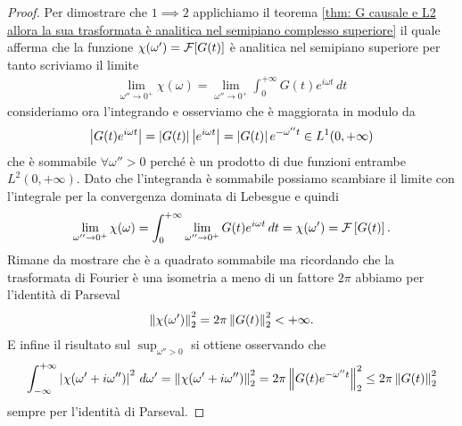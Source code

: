 \begin{proof} %
  Per dimostrare che $ 1 \implies 2 $ applichiamo il teorema 
  \ref{thm: G causale e L2 allora la sua trasformata è analitica nel semipiano complesso superiore} il quale afferma che la funzione 
  $ \chi(\omega') = \operatorname{\mathcal{F}}[G(t)] $ è analitica nel semipiano superiore per tanto scriviamo il limite 
  \begin{align}
    \lim_{\omega''\to 0^+} \chi(\omega) = \lim_{\omega''\to 0^+} \int_{0}^{+\infty} G(t) e^{i\omega t} \, dt
  \end{align}
  consideriamo ora l'integrando e osserviamo che è maggiorata in modulo da 
  \begin{align}
    \left|{G(t) e^{i\omega t}}\right| = \left|{G(t)}\right| \left|{ e^{i\omega t}}\right| = \left|{G(t)}\right| e^{-\omega'' t} \in L^1(0, +\infty)
  \end{align}
  che è sommabile $ \forall \omega'' > 0 $ perché è un prodotto di due funzioni entrambe $ L^2(0, +\infty) $. Dato che l'integranda è sommabile possiamo scambiare il limite con 
  l'integrale per la convergenza dominata di Lebesgue e quindi
  \begin{align}
    \lim_{\omega''\to 0^+} \chi(\omega) =  \int_{0}^{+\infty} \lim_{\omega''\to 0^+} G(t) e^{i\omega t} \, dt = \chi(\omega') = \operatorname{\mathcal{F}}\left[ G(t) \right].
  \end{align}
  Rimane da mostrare che è a quadrato sommabile ma ricordando che la trasformata di Fourier è una isometria a meno di un fattore $ 2\pi $ 
  abbiamo per l'identità di Parseval
  \begin{align}
    \left\lVert \chi(\omega') \right\rVert^2_2 = 2\pi \left\lVert G(t) \right\rVert^2_2 < +\infty.
  \end{align}
  E infine il risultato sul $ \sup_{\omega'' > 0} $ si ottiene osservando che 
  \begin{align}
    \int_{-\infty}^{+\infty} \left|{\chi(\omega' + i \omega'')}\right|^2 \, d\omega' 
    = \left\lVert \chi(\omega' + i \omega'') \right\rVert_2^2 = 2\pi \left\lVert G(t) e^{-\omega'' t} \right\rVert_2^2 \leq 2\pi \left\lVert G(t) \right\rVert_2^2
  \end{align}
  sempre per l'identità di Parseval.
  

\end{proof}
